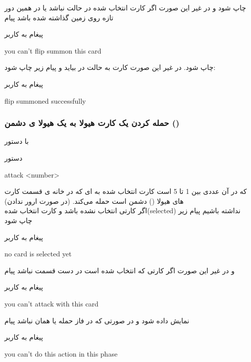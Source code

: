 \documentclass[]{article}
\begin{document}
چاپ شود و در غیر این صورت اگر کارت انتخاب شده در حالت  نباشد یا در 
همین دور تازه روی زمین گذاشته شده باشد پیام
\begin{mybox}[colback=yellow]{پیغام به کاربر}
	\begin{latin}	
	    you can’t flip summon this card
	\end{latin}
\end{mybox}
    چاپ شود. در غیر این صورت کارت به حالت  در بیاید و پیام زیر چاپ 
    شود:
\begin{mybox}[colback=yellow]{پیغام به کاربر}
	\begin{latin}	
	    flip summoned successfully		
	\end{latin}
\end{mybox}

\subsubsection*{{\titr حمله کردن یک کارت هیولا به یک هیولا ی دشمن ()
}}
    با دستور
\begin{mybox}[colback=yellow]{دستور}
	\begin{latin}	
	    attack <number>	
	\end{latin}
\end{mybox}
که در آن  عددی بین 1 تا 5 است کارت انتخاب شده به  ای 
که در خانه ی  قسمت کارت های هیولا () دشمن 
است 
حمله می‌کند. (در صورت ارور ندادن)
\\
    اگر کارتی انتخاب نشده باشد و کارت انتخاب شده(selected) نداشته باشیم پیام 
    زیر چاپ شود
\begin{mybox}[colback=yellow]{پیغام به کاربر}
	\begin{latin}	
		no card is selected yet
	\end{latin}
\end{mybox}
و در غیر این صورت اگر کارتی که انتخاب شده است در دست قسمت
 نباشد پیام
\begin{mybox}[colback=yellow]{پیغام به کاربر}
	\begin{latin}	
		you can’t attack with this card
	\end{latin}
\end{mybox}
نمایش داده شود و در صورتی که در فاز حمله یا همان  نباشد 
پیام
\begin{mybox}[colback=yellow]{پیغام به کاربر}
	\begin{latin}	
		you can’t do this action in this phase
	\end{latin}
\end{mybox}
\end{document}
